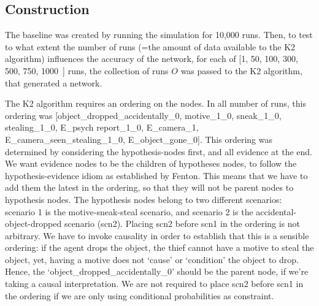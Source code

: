 \documentclass[12pt]{article}
\begin{document}
\subsection{Construction}
The baseline was created by running the simulation for 10,000 runs. Then, to test to what extent the number of runs (=the amount of data available to the K2 algorithm) influences the accuracy of the network, for each of [1, 50, 100, 300, 500, 750, 1000~] runs, the collection of runs $O$ was passed to the K2 algorithm, that generated a network.

The K2 algorithm requires an ordering on the nodes. In all number of runs, this ordering was 
[object\_dropped\_accidentally\_0, motive\_1\_0, sneak\_1\_0, stealing\_1\_0, E\_psych report\_1\_0, E\_camera\_1, E\_camera\_seen\_stealing\_1\_0, E\_object\_gone\_0]. This ordering was determined by considering the hypothesis-nodes first, and all evidence at the end. We want evidence nodes to be the children of hypotheses nodes, to follow the hypothesis-evidence idiom as established by Fenton. This means that we have to add them the latest in the ordering, so that they will not be parent nodes to hypothesis nodes. The hypothesis nodes belong to two different scenarios: scenario 1 is the motive-sneak-steal scenario, and scenario 2 is the accidental-object-dropped scenario (scn2). Placing scn2 before scn1 in the ordering is not arbitrary. We have to invoke causality in order to establish that this is a sensible ordering: if the agent drops the object, the thief cannot have a motive to steal the object, yet, having a motive does not `cause' or `condition' the object to drop. Hence, the `object\_dropped\_accidentally\_0' should be the parent node, if we're taking a causal interpretation. We are not required to place scn2 before scn1 in the ordering if we are only using conditional probabilities as constraint.
 
\end{document}
